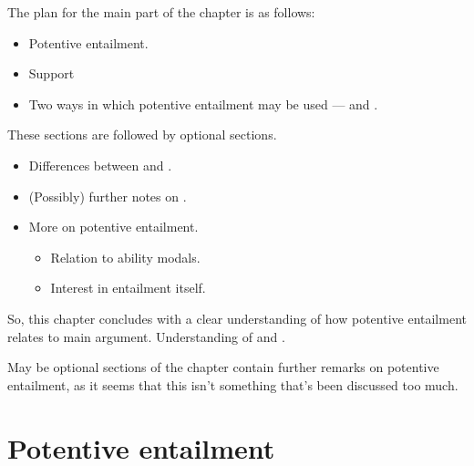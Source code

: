 \begin{note}
  The plan for the main part of the chapter is as follows:
  \begin{itemize}
  \item Potentive entailment.
  \item Support
  \item Two ways in which potentive entailment may be used --- \AR{} and \WR{}.
  \end{itemize}

  These sections are followed by optional sections.
  \begin{itemize}
  \item Differences between \AR{} and \WR{}.
  \item (Possibly) further notes on \WR{}.
  \item More on potentive entailment.
    \begin{itemize}
    \item Relation to ability modals.
    \item Interest in entailment itself.
    \end{itemize}
  \end{itemize}
\end{note}

\begin{note}[Wrapping up]
  So, this chapter concludes with a clear understanding of how potentive entailment relates to main argument.
  Understanding of \WR{} and \AR{}.
\end{note}

\begin{note}[Optional]
  May be optional sections of the chapter contain further remarks on potentive entailment, as it seems that this isn't something that's been discussed too much.
\end{note}

\section{Potentive entailment}
\label{sec:potentive-entailment}

